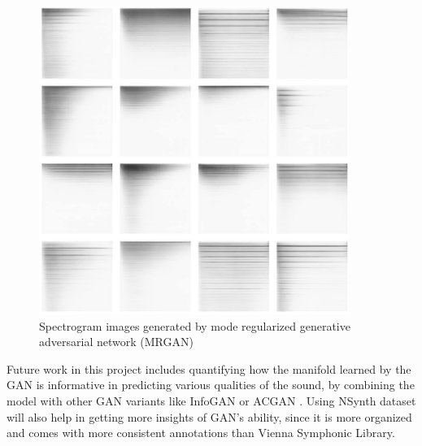 \begin{figure}
	\centering
	\includegraphics[width=0.9\textwidth]{gan.jpg}
	\caption{Spectrogram images generated by mode regularized generative adversarial network (MRGAN) %
	}\label{fig:gan}
\end{figure}

Future work in this project includes quantifying how the manifold learned by the GAN is informative in predicting various qualities of the sound, by combining the model with other GAN variants like InfoGAN \cite{chen2016infogan} or ACGAN \cite{odena2016acgan}.
Using NSynth dataset will also help in getting more insights of GAN's ability, since it is more organized and comes with more consistent annotations than Vienna Symphonic Library.

